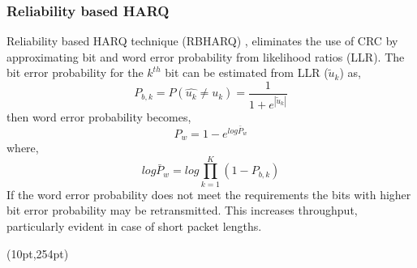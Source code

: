 \documentclass[xcolor=dvipsnames]{beamer}
\newcommand\hyperback[1]{%
  \begin{textblock*}{\paperwidth}(10pt,254pt)
    \raggedright #1\hspace{.5em}
  \end{textblock*}}
\begin{document}
\begin{frame}[label = rbharq]
\frametitle{Reliability based HARQ}
Reliability based HARQ technique (RBHARQ) , eliminates the use of CRC by approximating bit and word error probability from likelihood ratios (LLR).   The bit error probability for the $k^{th}$ bit can be estimated from LLR ($\tilde{u}_k$) as,
\begin{equation}\label{eq:errorllr}
P_{b,k}=P(\hat{u_k} \neq u_k) = \frac{1}{1+e^{|\tilde{u}_k|}}
\end{equation}
then word error probability becomes, 
\begin{equation}
P_w=1-e^{log\bar{P}_w}
\end{equation}
where, $$log\bar{P}_w=log\prod_{k=1}^K (1- P_{b,k})$$ 
If the word error probability does not meet the requirements the bits with higher bit error probability may be retransmitted. This increases throughput, particularly evident in case of short packet lengths.
\hyperback{\hyperlink{HARQ}{}}
\end{frame}
\end{document}
